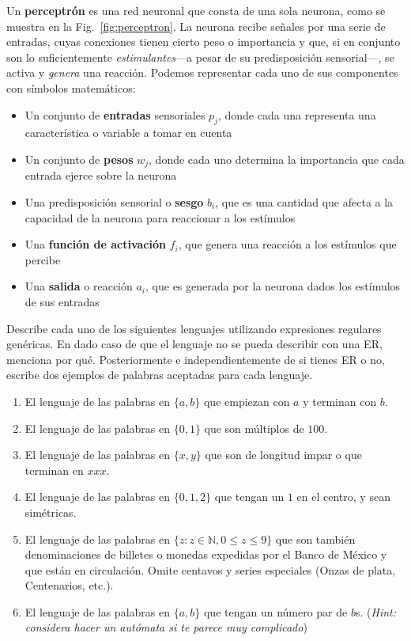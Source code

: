 \documentclass{article}
\begin{document}
Un \textbf{perceptrón} es una red neuronal que consta de una sola neurona, como se muestra en la Fig.~\ref{fig:perceptron}.
La neurona recibe señales por una serie de entradas, cuyas conexiones tienen cierto peso o importancia y que, si en conjunto son lo suficientemente \textit{estimulantes}---a pesar de su predisposición sensorial---, se activa y \textit{genera} una reacción.
Podemos representar cada uno de sus componentes con símbolos matemáticos:
\begin{itemize}
    \item Un conjunto de \textbf{entradas} sensoriales $p_j$, donde cada una representa una característica o variable a tomar en cuenta
    \item Un conjunto de \textbf{pesos} $w_{j}$, donde cada uno determina la importancia que cada entrada ejerce sobre la neurona
    \item Una predisposición sensorial o \textbf{sesgo} $b_i$, que es una cantidad que afecta a la capacidad de la neurona para reaccionar a los estímulos
    \item Una \textbf{función de activación} $f_i$, que genera una reacción a los estímulos que percibe
    \item Una \textbf{salida} o reacción $a_i$, que es generada por la neurona dados los estímulos de sus entradas
\end{itemize}



Describe cada uno de los siguientes lenguajes utilizando expresiones regulares genéricas. En dado caso de que el lenguaje no se pueda describir con una ER, menciona por qué. Posteriormente e independientemente de si tienes ER o no, escribe dos ejemplos de palabras aceptadas para cada lenguaje.

\begin{enumerate}[label=\tt \alph*)]
    \itemsep0em
    \item El lenguaje de las palabras en $\{a,b\}$ que empiezan con $a$ y terminan con $b$.
    \item El lenguaje de las palabras en $\{0,1\}$ que son múltiplos de $100$.
    \item El lenguaje de las palabras en $\{x, y\}$ que son de longitud impar o que terminan en $xxx$.
    \item El lenguaje de las palabras en $\{0,1,2\}$ que tengan un $1$ en el centro, y sean simétricas.
    \item El lenguaje de las palabras en $\{z : z \in \mathbb{N}, 0 \leq z \leq 9\}$ que son también denominaciones de billetes o monedas expedidas por el Banco de México y que están en circulación. Omite centavos y series especiales (Onzas de plata, Centenarios, etc.).
    \item El lenguaje de las palabras en $\{a,b\}$ que tengan un número par de $b$s. (\textit{Hint: considera hacer un autómata si te parece muy complicado})
\end{enumerate}
\end{document}
